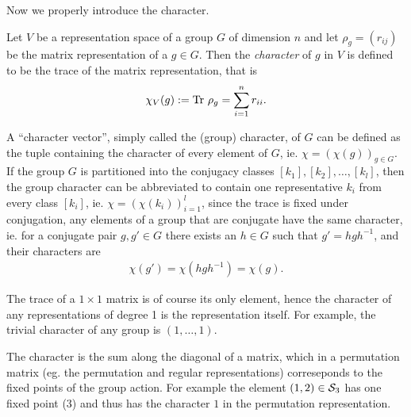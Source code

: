 Now we properly introduce the character.

\begin{definition}\label{def:char}
	Let $V$ be a representation space of a group $G$ of dimension $n$ and let $\rho_g = (r_{ij})$ be the matrix representation of a $g \in G$. Then the \emph{character} of $g$ in $V$ is defined to be the trace of the matrix representation, that is 
	\begin{align*}
		\chi_V(g) := \text{Tr } \rho_g = \sum_{i=1}^{n} r_{ii}.
	\end{align*}
\end{definition}


\begin{notation}
	A ``character vector'', simply called the (group) character, of $G$ can be defined as the tuple containing the character of every element of $G$, ie. $\chi = (\chi(g))_{g \in G}$. If the group $G$ is partitioned into the conjugacy classes $[k_1], [k_2], \dots, [k_l]$, then the group character can be abbreviated to contain one representative $k_i$ from every class $[k_i]$, ie. $\chi= (\chi(k_i))_{i=1}^l$, since the trace is fixed under conjugation, any elements of a group that are conjugate have the same character, ie. for a conjugate pair $g,g' \in G$ there exists an $h \in G$ such that $g' = hgh^{-1}$, and their characters are
	\begin{align*}
		\chi(g') = \chi(hgh^{-1}) = \chi(g).
	\end{align*}
\end{notation}

\begin{example}
	The  trace of a $1 \times 1$ matrix is of course its only element, hence the character of any representations of degree 1 is the representation itself.
	For example, the trivial character of any group is $(1, \dots, 1)$. 
\end{example}

\begin{example}\label{example:charperm}
	The character is the sum along the diagonal of a matrix, which in a permutation matrix (eg. the permutation and regular representations) correseponds to the fixed points of the group action. For example the element $(1,2) \in \mathcal{S}_3$ has one fixed point ($3$) and thus has the character $1$ in the permutation representation. 
\end{example}

